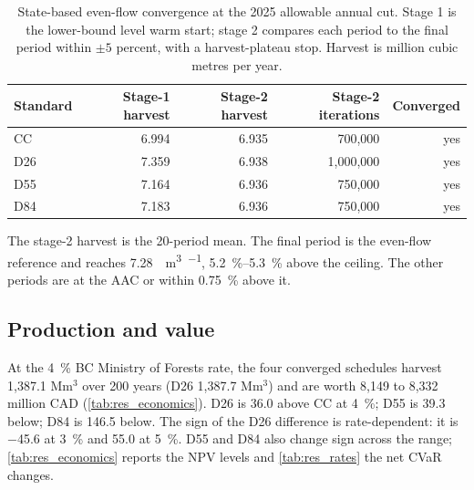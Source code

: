 \begin{table}[h]
    \centering
    \small
    \caption{State-based even-flow convergence at the 2025 allowable annual cut. Stage 1 is the
    lower-bound level warm start; stage 2 compares each period to the final period within
    $\pm 5$ percent, with a harvest-plateau stop. Harvest is million cubic metres per year.}
    \label{tab:res_convergence}
    \begin{tabular}{lrrrr}
        \toprule
        Standard & Stage-1 harvest & Stage-2 harvest & Stage-2 iterations & Converged \\
        \midrule
        CC  & 6.994 & 6.935 & 700,000  & yes \\
        D26 & 7.359 & 6.938 & 1,000,000 & yes \\
        D55 & 7.164 & 6.936 & 750,000  & yes \\
        D84 & 7.183 & 6.936 & 750,000  & yes \\
        \bottomrule
    \end{tabular}
    \par\smallskip\footnotesize The stage-2 harvest is the 20-period mean. The final period is
    the even-flow reference and reaches \SI{7.28}{\mega\cubic\meter\per\year},
    \SIrange{5.2}{5.3}{\percent} above the ceiling. The other periods are at the AAC or within
    \SI{0.75}{\percent} above it.
\end{table}

\subsection{Production and value}

At the \SI{4}{\percent} BC Ministry of Forests rate, the four converged schedules harvest
1,387.1 Mm$^3$ over 200 years (D26 1,387.7 Mm$^3$) and are worth 8,149 to 8,332 million CAD
(\autoref{tab:res_economics}). D26 is
\SI{36.0}{\millionCAD} above CC at \SI{4}{\percent}; D55 is \SI{39.3}{\millionCAD} below; D84 is
\SI{146.5}{\millionCAD} below. The sign of the D26 difference is rate-dependent: it is
\SI{-45.6}{\millionCAD} at \SI{3}{\percent} and \SI{+55.0}{\millionCAD} at \SI{5}{\percent}. D55 and
D84 also change sign across the range; \autoref{tab:res_economics} reports the NPV levels and
\autoref{tab:res_rates} the net CVaR changes.

